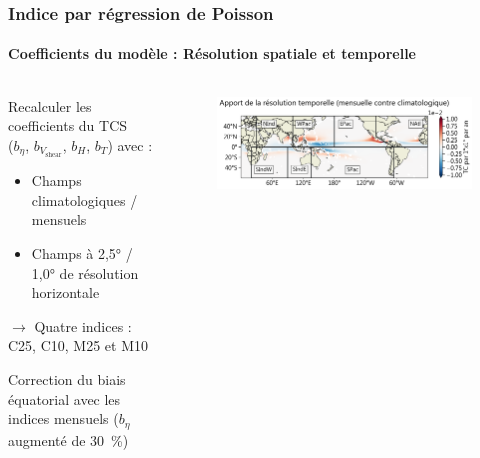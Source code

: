 \documentclass[aspectratio=169, usepdftitle=false, xcolor={dvipsnames}, 9pt,table]{beamer}
\begin{document}
\begin{frame}
    \frametitle{Indice par régression de Poisson}
    \framesubtitle{Coefficients du modèle : Résolution spatiale et temporelle}
    \footnotesize
    \begin{columns}
        \begin{column}{0.35\textwidth}
            \begin{examples}
                Recalculer les coefficients du TCS\\($b_\eta$, $b_{V_\text{shear}}$, $b_H$, $b_T$) avec :
                \setlength{\leftmargini}{2.5ex}
                \begin{itemize}
                    \item Champs climatologiques / mensuels
                    \item Champs à 2,5° / 1,0° de résolution horizontale
                \end{itemize}
                $\longrightarrow$ Quatre indices : C25, C10, M25 et M10
            \end{examples}
            \begin{block}[Analyse]
                Correction du biais équatorial avec les indices mensuels ($b_\eta$ augmenté de 30~\%)
            \end{block}
        \end{column}
        \begin{column}{0.65\textwidth}
            \vspace{-1em}
            \begin{figure}
                \raggedleft
                \includegraphics[width=\textwidth]{Figures/apport_mensuel.png}

\end{figure}
\end{column}
\end{columns}
\end{frame}
\end{document}
